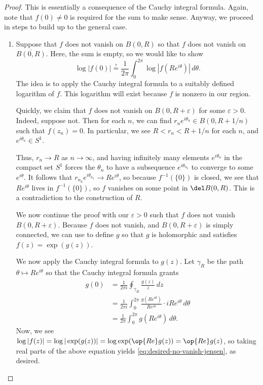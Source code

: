 \documentclass[notes.tex]{subfiles}
\begin{document}
\begin{proof}
	This is essentially a consequence of the Cauchy integral formula. Again, note that $f(0)\ne0$ is required for the sum to make sense. Anyway, we proceed in steps to build up to the general case.
	\begin{enumerate}
		\item Suppose that $f$ does not vanish on $B(0,R)$ so that $f$ does not vanish on $\overline{B(0,R)}$. Here, the sum is empty, so we would like to show
		\begin{equation}
			\log|f(0)|\stackrel?=\frac1{2\pi}\int_0^{2\pi}\log\left|f\left(Re^{i\theta}\right)\right|\,d\theta. \label{eq:desired-no-vanish-jensen}
		\end{equation}
		The idea is to apply the Cauchy integral formula to a suitably defined logarithm of $f$. This logarithm will exist because $f$ is nonzero in our region.
		
		Quickly, we claim that $f$ does not vanish on $B(0,R+\varepsilon)$ for some $\varepsilon>0$. Indeed, suppose not. Then for each $n$, we can find $r_ne^{i\theta_n}\in B(0,R+1/n)$ such that $f(z_n)=0$. In particular, we see $R<r_n<R+1/n$ for each $n$, and $e^{i\theta_n}\in S^1$.
		
		Thus, $r_n\to R$ as $n\to\infty$, and having infinitely many elements $e^{i\theta_n}$ in the compact set $S^1$ forces the $\theta_n$ to have a subsequence $e^{i\theta_{n_k}}$ to converge to some $e^{i\theta}$. It follows that $r_{n_k}e^{i\theta_{n_k}}\to Re^{i\theta}$, so because $f^{-1}(\{0\})$ is closed, we see that $Re^{i\theta}$ lives in $f^{-1}(\{0\})$, so $f$ vanishes on some point in $\del B(0,R)$. This is a contradiction to the construction of $R$.

		We now continue the proof with our $\varepsilon>0$ such that $f$ does not vanish $B(0,R+\varepsilon)$. Because $f$ does not vanish, and $B(0,R+\varepsilon)$ is simply connected, we can use  to define $g$ so that $g$ is holomorphic and satisfies $f(z)=\exp(g(z))$.

		We now apply the Cauchy integral formula to $g(z)$. Let $\gamma_R$ be the path $\theta\mapsto Re^{i\theta}$ so that the Cauchy integral formula grants
		\begin{align*}
			g(0) &= \frac1{2\pi i}\oint_{\gamma_R}\frac{g(z)}z\,dz \\
			&= \frac1{2\pi i}\int_0^{2\pi}\frac{g\left(Re^{i\theta}\right)}{Re^{i\theta}}\cdot iRe^{i\theta}\,d\theta \\
			&= \frac1{2\pi}\int_0^{2\pi}g\left(Re^{i\theta}\right)\,d\theta.
		\end{align*}
		Now, we see $\log|f(z)|=\log|\exp(g(z))|=\log\exp(\op{Re}g(z))=\op{Re}g(z)$, so taking real parts of the above equation yields \eqref{eq:desired-no-vanish-jensen}, as desired.


\end{enumerate}
\end{proof}
\end{document}
